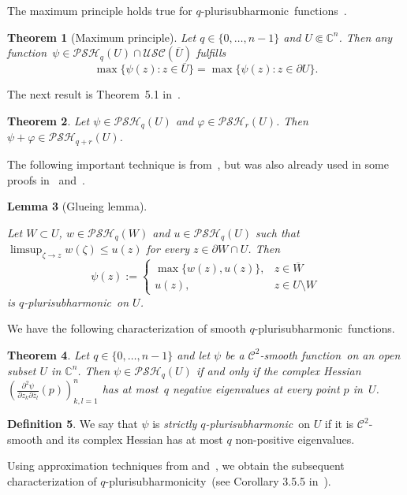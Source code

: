 \documentclass[reqno]{amsart}
\newtheorem{thm}{Theorem}[section]
\newtheorem{lem}[thm]{Lemma}
\theoremstyle{definition}
\newtheorem{defn}[thm]{Definition}
\numberwithin{equation}{section}
\newcommand{\cbb}{\mathbb{C}}
\newcommand{\ccal}{\mathcal{C}}
\newcommand{\USC}{\mathcal{USC}}
\newcommand{\qpsh}{$q$-pluri\-sub\-harmonic}
\newcommand{\qpshy}{$q$-pluri\-sub\-harmonicity}
\newcommand{\PSH}{\mathcal{PSH}}
\newcommand{\cl}[1]{\overline{#1}}
\newcommand{\fct}{function}
\newcommand{\fcts}{functions}
\newcommand{\relc}{\Subset}
\begin{document}
The maximum principle holds true for \qpsh\ \fcts~\cite{HM}.

\begin{thm}[Maximum principle] \label{prop-qpsh-locmax} Let $q\in\{ 0,\ldots,n-1\}$ and $U \relc \cbb^n$. Then any \fct\ $\psi \in \PSH_q(U) \cap \USC(\cl{U})$ fulfills
\[
\max\{ \psi(z) : z \in \cl{U}\} = \max\{\psi(z) : z \in \partial U\}.
\]
\end{thm}

The next result is Theorem~5.1 in~\cite{Sl84}.

\begin{thm}\label{thm-add-qpsh} Let $\psi \in \PSH_q(U)$ and $\varphi \in \PSH_r(U)$. Then $\psi+\varphi \in \PSH_{q+r}(U)$.
\end{thm}

The following important technique is from~\cite{Dieu}, but was also already used in some proofs in~\cite{HM} and~\cite{Sl84}.

\begin{lem}[Glueing lemma]\label{lem-glueing}

Let $W \subset U$, $w \in \PSH_q(W)$ and $u \in \PSH_q(U)$ such that $\limsup_{\zeta \to z} w(\zeta) \leq u(z)$ for every $z \in \partial W \cap U$. Then
\[
\psi(z):=\begin{cases} \max\{w(z),u(z)\}, & z \in \cl{W} \\ u(z), & z \in U\setminus W \end{cases}
\]
is \qpsh\ on $U$.
\end{lem}

We have the following characterization of smooth \qpsh\ \fcts.

\begin{thm}\label{smooth-qpsh} Let $q \in \{0,\ldots,n-1\}$ and let $\psi$ be a $\ccal^2$-smooth \fct\ on an open subset $U$ in $\cbb^n$. Then $\psi \in \PSH_q(U)$ if and only if the complex Hessian $\left( \frac{\partial^2 \psi}{\partial z_k \partial \overline{z}_l}(p)\right)_{k,l=1}^n$ has at most~$q$ negative eigenvalues at every point $p$ in~$U$.
\end{thm}

\begin{defn}\label{defn-sqpsh} We say that $\psi$ is \textit{strictly \qpsh}\ on $U$ if it is $\ccal^2$-smooth and its complex Hessian has at most $q$ non-positive eigenvalues.
\end{defn}

Using approximation techniques from \cite{Sl84} and~\cite{Bu}, we obtain the subsequent characterization of \qpshy\ (see Corollary 3.5.5 in~\cite{TPTHESIS}).
\end{document}
